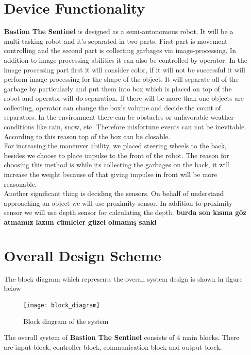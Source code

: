 \documentclass[12pt,a4paper]{article}
\begin{document}
\section{Device Functionality}
 \begin{flushleft}
  \textbf{Bastion The Sentinel} is designed as a semi-autonomous robot. It will be a multi-tasking robot and it's separated in 
  two parts. First part is movement controlling and the second part is collecting garbages via image-processing. In addition to 
  image processing abilities it can also be controlled by operator. In the image processing part first it will consider color, 
  if it will not be successful it will perform image processing for the shape of the object. It will separate 
  all of the garbage by particularly and put them into box which is placed on top of the robot and operator will do separation. 
  If there will be more than one objects are collecting, operator can change the box's volume and decide the count of separators.
  In the environment there can be obstacles or unfavorable weather conditions like rain, snow, etc. Therefore misfortune events 
  can not be inevitable. According to this reason top of the box can be closable. \\
  For increasing the maneuver ability, we placed steering wheels to the back, besides we choose to place impulse to the front of 
  the robot. The reason for choosing this method is while its collecting the garbages on the back, it will increase the weight because 
  of that giving impulse in front will be more reasonable. \\
  Another significant thing is deciding the sensors. On behalf of understand 
  approaching an object we will use proximity sensor. In addition to proximity sensor we will use depth sensor for calculating the depth. 
  \textbf{burda son kısma göz atmamız lazım cümleler güzel olmamış sanki}
 \end{flushleft}
 
 \pagebreak
 \section{Overall Design Scheme}
 \begin{flushleft}
  The block diagram which represents the overall system design is shown in figure below\\
  \begin{figure}[h]
   \begin{center}
    \texttt{[image: block\_diagram]}
    \caption{Block diagram of the system}
   \end{center}
  \end{figure}
  The overall system of \textbf{Bastion The Sentinel} consists of 4 main blocks. There are input block, controller block, 
  communication block and output block.
 \end{flushleft}
 
\end{document}

